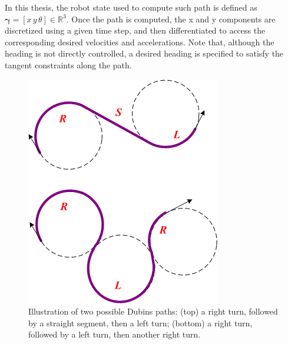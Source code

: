In this thesis, the robot state used to compute such path is defined as $\boldsymbol{\gamma} = [x \, y \, \theta] \in \mathbb{R}^3$.
Once the path is computed, the x and y components are discretized using a given time step, and then differentiated to access the corresponding desired velocities and accelerations.
Note that, although the heading is not directly controlled, a desired heading is specified to satisfy the tangent constraints along the path.

\begin{figure} [t]
  \centering
  \includegraphics[width=0.4\linewidth]{figures/models/dubins.png} 
  \caption{Illustration of two possible Dubins paths: (top) a right turn, followed by a straight segment, then a left turn; (bottom) a right turn, followed by a left turn, then another right turn.}%
  \label{fig:dubins}%
\end{figure}